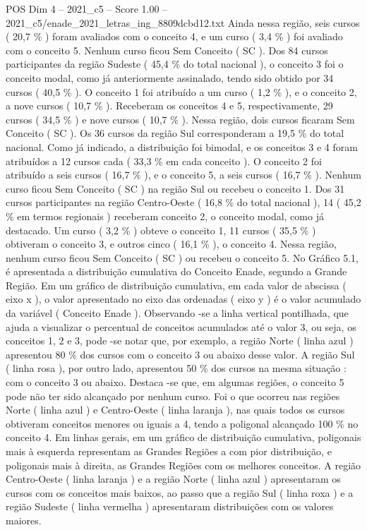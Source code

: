 \begin{textsample}{POS Dim 4 – 2021\_c5 – Score 1.00 – 2021\_c5/enade\_2021\_letras\_ing\_8809dcbd12.txt}
Ainda nessa região, seis cursos ( 20,7 \% ) foram avaliados com o conceito 4, e um curso ( 3,4 \% ) foi avaliado com o conceito 5.
Nenhum curso ficou Sem Conceito ( SC ).
Dos 84 cursos participantes da região Sudeste ( 45,4 \% do total nacional ), o conceito 3 foi o conceito modal, como já anteriormente assinalado, tendo sido obtido por 34 cursos ( 40,5 \% ).
O conceito 1 foi atribuído a um curso ( 1,2 \% ), e o conceito 2, a nove cursos ( 10,7 \% ).
Receberam os conceitos 4 e 5, respectivamente, 29 cursos ( 34,5 \% ) e nove cursos ( 10,7 \% ).
Nessa região, dois cursos ficaram Sem Conceito ( SC ).
Os 36 cursos da região Sul corresponderam a 19,5 \% do total nacional.
Como já indicado, a distribuição foi bimodal, e os conceitos 3 e 4 foram atribuídos a 12 cursos cada ( 33,3 \% em cada conceito ).
O conceito 2 foi atribuído a seis cursos ( 16,7 \% ), e o conceito 5, a seis cursos ( 16,7 \% ).
Nenhum curso ficou Sem Conceito ( SC ) na região Sul ou recebeu o conceito 1.
Dos 31 cursos participantes na região Centro-Oeste ( 16,8 \% do total nacional ), 14 ( 45,2 \% em termos regionais ) receberam conceito 2, o conceito modal, como já destacado.
Um curso ( 3,2 \% ) obteve o conceito 1, 11 cursos ( 35,5 \% ) obtiveram o conceito 3, e outros cinco ( 16,1 \% ), o conceito 4.
Nessa região, nenhum curso ficou Sem Conceito ( SC ) ou recebeu o conceito 5.
No Gráfico 5.1, é apresentada a distribuição cumulativa do Conceito Enade, segundo a Grande Região.
Em um gráfico de distribuição cumulativa, em cada valor de abscissa ( eixo x ), o valor apresentado no eixo das ordenadas ( eixo y ) é o valor acumulado da variável ( Conceito Enade ).
Observando -se a linha vertical pontilhada, que ajuda a visualizar o percentual de conceitos acumulados até o valor 3, ou seja, os conceitos 1, 2 e 3, pode -se notar que, por exemplo, a região Norte ( linha azul ) apresentou 80 \% dos cursos com o conceito 3 ou abaixo desse valor.
A região Sul ( linha rosa ), por outro lado, apresentou 50 \% dos cursos na mesma situação : com o conceito 3 ou abaixo.
Destaca -se que, em algumas regiões, o conceito 5 pode não ter sido alcançado por nenhum curso.
Foi o que ocorreu nas regiões Norte ( linha azul ) e Centro-Oeste ( linha laranja ), nas quais todos os cursos obtiveram conceitos menores ou iguais a 4, tendo a poligonal alcançado 100 \% no conceito 4.
Em linhas gerais, em um gráfico de distribuição cumulativa, poligonais mais à esquerda representam as Grandes Regiões a com pior distribuição, e poligonais mais à direita, as Grandes Regiões com os melhores conceitos.
A região Centro-Oeste ( linha laranja ) e a região Norte ( linha azul ) apresentaram os cursos com os conceitos mais baixos, ao passo que a região Sul ( linha roxa ) e a região Sudeste ( linha vermelha ) apresentaram distribuições com os valores maiores.

\end{textsample}
